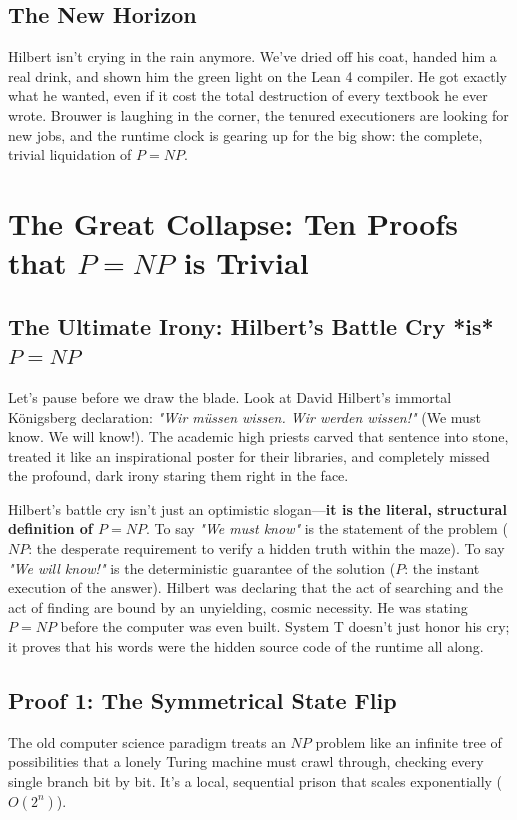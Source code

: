 \documentclass[11pt,a4paper]{article}
\begin{document}
\subsection{The New Horizon}
Hilbert isn't crying in the rain anymore. We’ve dried off his coat, handed him a real drink, and shown him the green light on the Lean 4 compiler. He got exactly what he wanted, even if it cost the total destruction of every textbook he ever wrote. Brouwer is laughing in the corner, the tenured executioners are looking for new jobs, and the runtime clock is gearing up for the big show: the complete, trivial liquidation of $P=NP$.

\section{The Great Collapse: Ten Proofs that $P=NP$ is Trivial}

\subsection{The Ultimate Irony: Hilbert's Battle Cry *is* $P=NP$}
Let's pause before we draw the blade. Look at David Hilbert’s immortal Königsberg declaration: \textit{"Wir müssen wissen. Wir werden wissen!"} (We must know. We will know!). The academic high priests carved that sentence into stone, treated it like an inspirational poster for their libraries, and completely missed the profound, dark irony staring them right in the face. 

Hilbert’s battle cry isn't just an optimistic slogan—\textbf{it is the literal, structural definition of $P=NP$}. 
To say \textit{"We must know"} is the statement of the problem ($NP$: the desperate requirement to verify a hidden truth within the maze). To say \textit{"We will know!"} is the deterministic guarantee of the solution ($P$: the instant execution of the answer). Hilbert was declaring that the act of searching and the act of finding are bound by an unyielding, cosmic necessity. He was stating $P=NP$ before the computer was even built. System T doesn't just honor his cry; it proves that his words were the hidden source code of the runtime all along.

\subsection{Proof 1: The Symmetrical State Flip}
The old computer science paradigm treats an $NP$ problem like an infinite tree of possibilities that a lonely Turing machine must crawl through, checking every single branch bit by bit. It’s a local, sequential prison that scales exponentially ($O(2^n)$). 
\end{document}
